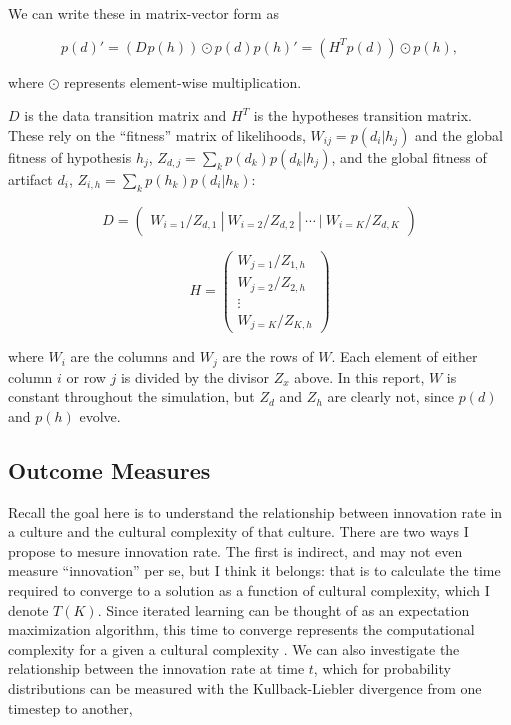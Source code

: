 \documentclass[11pt]{amsart}
\begin{document}
We can write these in matrix-vector form as 

\begin{subequations}
  \begin{equation}
    p(d)' = \left(D^{} p(h)\right) \odot p(d)
  \end{equation}
  \begin{equation}
    p(h)' = \left(H^T p(d)\right) \odot p(h),
  \end{equation}
\end{subequations}
\noindent

where $\odot$ represents element-wise multiplication.

$D$ is the data transition matrix and $H^T$ is the hypotheses transition matrix.
These rely on the ``fitness'' matrix of likelihoods, $W_{ij} = p(d_i|h_j)$ and
the global fitness of hypothesis $h_j$, $Z_{d,j} = \sum_k p(d_k)p(d_k|h_j)$,
and the global fitness of artifact $d_i$, $Z_{i,h} = \sum_k p(h_k)p(d_i|h_k)$:

\[
  D = \begin{pmatrix} W_{i=1}/Z_{d,1}~|~W_{i=2}/Z_{d,2}~|~\cdots~|~W_{i=K}/Z_{d,K} \end{pmatrix}
\]

\[
  H = \begin{pmatrix} W_{j=1}/Z_{1,h} \\
                      W_{j=2}/Z_{2,h} \\
                       \vdots         \\ 
                      W_{j=K}/Z_{K,h} \end{pmatrix}
\]

where $W_i$ are the columns and $W_j$ are the rows of $W$. Each element of 
either column $i$ or row $j$ is divided by the divisor $Z_x$ above.
In this report, $W$ is constant throughout the simulation, but $Z_d$ and $Z_h$
are clearly not, since $p(d)$ and $p(h)$ evolve.

\subsection{Outcome Measures}

Recall the goal here is to understand the relationship between innovation rate in
a culture and the cultural complexity of that culture. There are two ways
I propose to mesure innovation rate. The first is indirect, and may not even
measure ``innovation'' per se, but I think it belongs: that is to calculate the
time required to converge to a solution as a function of cultural complexity, 
which I denote $T(K)$. Since iterated learning can be thought of as an expectation
maximization algorithm, this time to converge represents the computational 
complexity for a given a cultural complexity 
\citep{Griffiths2007a,Kalish2007}. We can also investigate the relationship
between the innovation rate at time $t$, which for probability distributions can be
measured with the Kullback-Liebler divergence from one timestep to another, 
\end{document}

